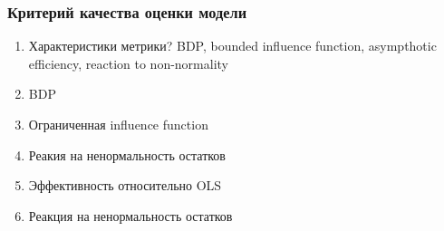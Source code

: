 \begin{frame}
\frametitle{Критерий качества оценки модели}
\begin{enumerate}
	\item Характеристики метрики? BDP, bounded influence function, asympthotic efficiency, reaction to non-normality
	
	\item BDP
	
	\item Ограниченная influence function
	
	\item Реакия на ненормальность остатков
	
	\item Эффективность относительно OLS
	
	\item Реакция на ненормальность остатков
	
	
\end{enumerate}
\end{frame}


